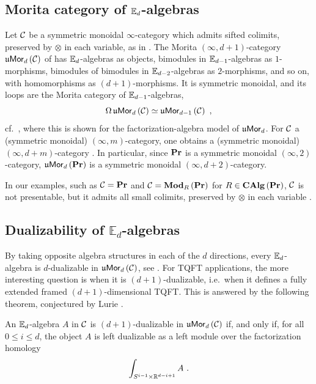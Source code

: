\subsection{Morita category of \texorpdfstring{$\mathbb{E}_d$}{Ed}-algebras}
\label{sec:mor}

Let $\mathcal{C}$ be a symmetric monoidal $\infty$-cate\-gory which admits sifted colimits,
preserved by $\otimes$ in each variable, as in \cite{SSS}.
The Morita $\left(\infty,d+1\right)$-category $\mathfrak{u}\mathsf{Mor}_d\left(\mathcal{C}\right)$ of \cite{SSS} has
$\mathbb{E}_d$-algebras as objects, bimodules in $\mathbb{E}_{d-1}$-algebras as $1$-morphisms, bimodules of
bimodules in $\mathbb{E}_{d-2}$-algebras as $2$-morphisms, and so on, with homomorphisms as
$\left(d+1\right)$-morphisms. It is symmetric monoidal, and its loops are the Morita category
of $\mathbb{E}_{d-1}$-algebras,
\begin{equation*}
\Omega\,\mathfrak{u}\mathsf{Mor}_d\left(\mathcal{C}\right)\simeq\mathfrak{u}\mathsf{Mor}_{d-1}\left(\mathcal{C}\right) \ ,
\end{equation*}
cf.\ \cite[Proposition 3.3.8]{Sch:thesis}, where this is shown for the
factorization-algebra model of $\mathfrak{u}\mathsf{Mor}_d$.
For $\mathcal{C}$ a (symmetric monoidal) $\left(\infty,m\right)$-category, one
obtains a (symmetric monoidal) $\left(\infty,d+m\right)$-category \cite{JFS}. In particular, since $\mathbf{Pr}$ is a symmetric monoidal
$\left(\infty,2\right)$-category, $\mathfrak{u}\mathsf{Mor}_d\left(\mathbf{Pr}\right)$ is a symmetric monoidal
$\left(\infty,d+2\right)$-category.

In our examples, such as $\mathcal{C}=\mathbf{Pr}$ and $\mathcal{C}=\mathbf{Mod}_R\left(\mathbf{Pr}\right)$ for
$R\in\mathbf{CAlg}\left(\mathbf{Pr}\right)$, $\mathcal{C}$ is not presentable, but it admits all small colimits,
preserved by $\otimes$ in each variable \cite[Section 4.8.1]{L:HA}.

\subsection{Dualizability of \texorpdfstring{$\mathbb{E}_d$}{Ed}-algebras}
\label{sec:dual_Ek}

By taking opposite algebra structures in each of the $d$ directions, every $\mathbb{E}_d$-algebra is $d$-dualizable in $\mathfrak{u}\mathsf{Mor}_d\left(\mathcal{C}\right)$, see \cite{GS}. For TQFT applications, the more interesting question is
 when it is $\left(d+1\right)$-dualizable, i.e.\ when it defines a fully extended
framed $\left(d+1\right)$-dimensional TQFT.
This is answered by the following theorem, conjectured by Lurie
\cite[Remark 4.1.27]{L:Cob}.

\begin{theorem}
\label{thm:SSS_dual}
An $\mathbb{E}_d$-algebra $A$ in $\mathcal{C}$ is $\left(d+1\right)$-dualizable in $\mathfrak{u}\mathsf{Mor}_d\left(\mathcal{C}\right)$ if,
and only if, for all $0\leq i\leq d$, the object $A$ is left dualizable as a left module over
the factorization homology
\begin{equation*}
\int_{S^{i-1}\times\RR^{d-i+1}}A \ .
\end{equation*}
\end{theorem}

